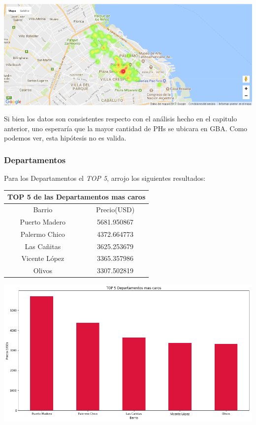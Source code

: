 \documentclass[a4paper, 10pt]{article}
\begin{document}
				\begin{center}
   		    				\includegraphics[width=\textwidth]{images/ubicPHc}
				\end{center}

				Si bien los datos son consistentes respecto con el análisis hecho en el capitulo anterior, uno esperaría que la mayor cantidad de PHs se ubicara en GBA. Como podemos ver, esta hipótesis no es valida.

				\subsubsection{Departamentos}
				Para los Departamentos el \emph{TOP 5}, arrojo los siguientes resultados:

					\begin{center}
						\begin{tabular}{ |c|c| }
							\hline
							\multicolumn{2}{|c|}{TOP 5 de las Departamentos mas caros}\\
							\hline
							\hline
							Barrio & Precio(USD)\\
							\hline
							Puerto Madero & 5681.950867 \\
							Palermo Chico & 4372.664773 \\
							Las Cañitas & 3625.253679 \\
							Vicente López & 3365.357986 \\
							Olivos & 3307.502819 \\
							\hline
						\end{tabular}
					\end{center}

				\begin{center}
   		    				\includegraphics[width=\textwidth]{images/topDc}
				\end{center}
\end{document}
